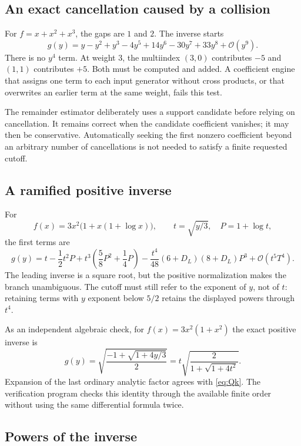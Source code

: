 \documentclass[11pt,a4paper]{article}
\theoremstyle{definition}
\theoremstyle{remark}
\newcommand{\OO}{\mathcal O}
\begin{document}
\subsection{An exact cancellation caused by a collision}

For $f=x+x^2+x^3$, the gaps are $1$ and $2$. The inverse starts
\begin{equation}\label{eq:collisionexample}
 g(y)=y-y^2+y^3-4y^5+14y^6-30y^7+33y^8+\OO(y^9).
\end{equation}
There is no $y^4$ term. At weight $3$, the multiindex $(3,0)$ contributes $-5$
and $(1,1)$ contributes $+5$. Both must be computed and added. A coefficient
engine that assigns one term to each input generator without cross products,
or that overwrites an earlier term at the same weight, fails this test.

The remainder estimator deliberately uses a support candidate before relying
on cancellation. It remains correct when the candidate coefficient vanishes;
it may then be conservative. Automatically seeking the first nonzero
coefficient beyond an arbitrary number of cancellations is not needed to
satisfy a finite requested cutoff.

\subsection{A ramified positive inverse}

For
\[
 f(x)=3x^2\bigl(1+x(1+\log x)\bigr),\qquad
 t=\sqrt{y/3},\quad P=1+\log t,
\]
the first terms are
\begin{equation}\label{eq:ramified}
 g(y)=t-\frac12t^2P
 +t^3\left(\frac58P^2+\frac14P\right)
 -\frac{t^4}{48}(6+D_L)(8+D_L)P^3
 +\OO(t^5T^4).
\end{equation}
The leading inverse is a square root, but the positive normalization makes the
branch unambiguous. The cutoff must still refer to the exponent of $y$, not of
$t$: retaining terms with $y$ exponent below $5/2$ retains the displayed
powers through $t^4$.

As an independent algebraic check, for $f(x)=3x^2(1+x^2)$ the exact positive
inverse is
\[
 g(y)=\sqrt{\frac{-1+\sqrt{1+4y/3}}{2}}
     =t\sqrt{\frac{2}{1+\sqrt{1+4t^2}}}.
\]
Expansion of the last ordinary analytic factor agrees with
\eqref{eq:Qk}. The verification program checks this identity through the
available finite order without using the same differential formula twice.

\subsection{Powers of the inverse}
\end{document}
